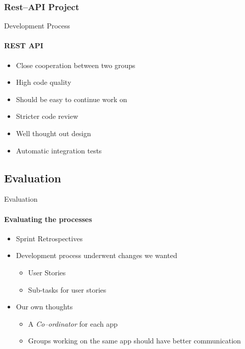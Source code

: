 	\subsubsection{Rest--API Project}
		\begin{frame}[t]{Development Process}\framesubtitle{REST API}
	
    \begin{itemize}
        \item Close cooperation between two groups
        \item High code quality
        \item Should be easy to continue work on
        \item Stricter code review
        \item Well thought out design
        \item Automatic integration tests
    \end{itemize}
	\end{frame}

	\subsection{Evaluation}
		\begin{frame}[t]{Evaluation}\framesubtitle{Evaluating the processes}
	
    \begin{itemize}
        \item Sprint Retrospectives
        \item Development process underwent changes we wanted
        \begin{itemize}
        	\item User Stories
        	\item Sub-tasks for user stories
        \end{itemize}
        \item Our own thoughts
        	\begin{itemize}
        		\item A \textit{Co--ordinator} for each app
        		\item Groups working on the same app should have better communication
        	\end{itemize}
    \end{itemize}
	\end{frame}